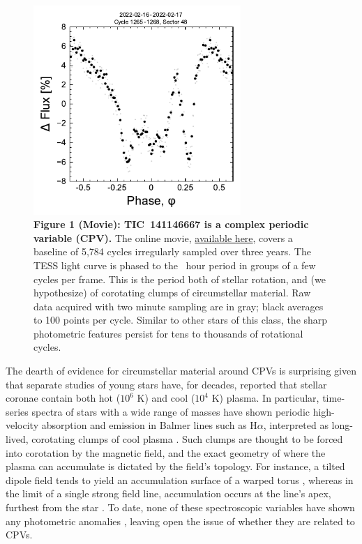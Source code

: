 \documentclass{nature3}
\begin{document}
\begin{figure}[!t]
  \centering
  \includegraphics[width=0.7\textwidth]{figures/f1.pdf}
  \captionsetup{labelformat=empty}
  \caption{{\bf Figure 1 (Movie):  TIC~141146667 is a complex periodic
  variable (CPV).}  The online movie,
  \href{https://lgbouma.com/movies/TIC141146667_20250116.mp4}{available here},
  covers a baseline of 5{,}784 cycles irregularly sampled over three
  years.  The TESS light curve is phased to the \periodhr\ hour period
  in groups of a few cycles per frame.  This is the period both of
  stellar rotation, and (we hypothesize) of corotating clumps of
  circumstellar material.  Raw data acquired with two minute sampling
  are in gray; black averages to 100 points per cycle.  Similar to
  other stars of this class, the sharp photometric features persist
  for tens to thousands of rotational cycles. }
  \label{fig:lc}
\end{figure}

The dearth of evidence for circumstellar material around CPVs is
surprising given that separate studies of young stars have, for
decades, reported that stellar coronae contain both hot ($10^6$ K) and
cool ($10^4$ K) plasma. In particular, time-series spectra of stars
with a wide range of masses have shown periodic high-velocity
absorption and emission in Balmer lines such as H$\alpha$, interpreted
as long-lived, corotating clumps of cool plasma
\cite{CollierCameron1989,CollierCameron1992,Barnes2000,Donati2000,Dunstone2006,Skelly2008,Leitzinger2016,Cang2021}.
Such clumps are thought to be forced into corotation by the magnetic
field, and the exact geometry of where the plasma can accumulate is
dictated by the field's topology.  For instance, a tilted dipole field
tends to yield an accumulation surface of a warped torus
\cite{Townsend2005}, whereas in the limit of a single strong field
line, accumulation occurs at the line's apex, furthest from the star
\cite{Waugh2022}.  To date, none of these spectroscopic variables have
shown any photometric anomalies \cite{Bouma2024}, leaving open the
issue of whether they are related to CPVs.
\end{document}
